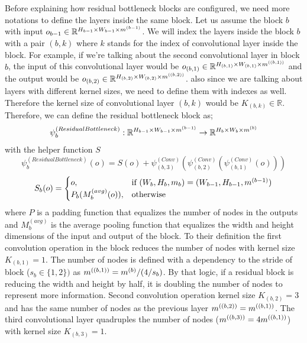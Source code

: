 Before explaining how residual bottleneck blocks are configured, we need more notations to define the layers inside the same block. Let us assume the block $b$ with input $o_{b-1} \in \mathbb{R}^{H_{b-1} \times W_{b-1} \times m^{(b-1)}}$. We will index the layers inside the block $b$ with a pair $(b, k)$ where $k$ stands for the index of convolutional layer inside the block. For example, if we're talking about the second convolutional layer in block $b$, the input of this convolutional layer would be $o_{(b, 1)} \in \mathbb{R}^{H_{(b, 1)} \times W_{(b, 1)} \times m^{((b, 1))}}$ and the output would be $o_{(b, 2)} \in \mathbb{R}^{H_{(b, 2)} \times W_{(b, 2)} \times m^{((b, 2))}}$. also since we are talking about layers with different kernel sizes, we need to define them with indexes as well. Therefore the kernel size of convolutional layer $(b,k)$ would be $K_{(b,k)} \in \mathbb{R}$.
Therefore, we can define the residual bottleneck block as;
$$ \psi_b^{(ResidualBottleneck)}: \mathbb{R}^{H_{b-1} \times W_{b-1} \times m^{(b-1)}} \rightarrow  \mathbb{R}^{H_{b} \times W_{b} \times m^{(b)}} $$
with the helper function $S$
$$ \psi_b^{(ResidualBottleneck)}(o) =  S(o) + \psi_{(b, 3)}^{(Conv)}(\psi_{(b, 2)}^{(Conv)}(\psi_{(b, 1)}^{(Conv)}(o))) $$
\begin{equation*}
    S_b(o) = 
\begin{cases}
    o, &\text{if } (W_b, H_b, m_b) = (W_{b-1}, H_{b-1}, m^{(b-1)})\\
    P_b(M_b^{(avg)}(o)),& \text{otherwise}\\
\end{cases}
\end{equation*}
where $P$ is a padding function that equalizes the number of nodes in the outputs and $M_b^{(avg)}$ is the average pooling function that equalizes the width and height dimensions of the input and output of the block.
To their definition the first convolution operation in the block reduces the number of nodes with kernel size $K_{(b,1)}=1$. The number of nodes is defined with a dependency to the stride of block ($s_b \in \{1,2\})$ as $m^{((b,1))} = m^{(b)}/(4/s_b)$. By that logic, if a residual block is reducing the width and height by half, it is doubling the number of nodes to represent more information. Second convolution operation kernel size $K_{(b,2)}=3$ and has the same number of nodes as the previous layer $m^{((b,2))} = m^{((b,1))}$. The third convolutional layer quadruples the number of nodes ($m^{((b,3))} = 4m^{((b,1))}$) with kernel size $K_{(b,3)} = 1$.

\fi

